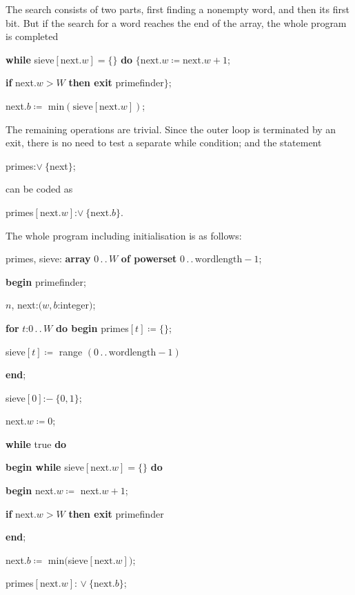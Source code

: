 The search consists of two parts, first finding a nonempty word, and then its first bit. But if the search for a word reaches the end of the array, the whole program is completed

\quad \textbf{while} sieve$[\text{next}.w] = \{\}$ \textbf{do} $\{\text{next}.w \coloneq \text{next}.w +1$;

\quad \quad \textbf{if} next.$w > W$ \textbf{then exit} primefinder$\}$;

\quad \quad next.$b\coloneq$ min$(\text{sieve}[\text{next}.w])$;

The remaining operations are trivial. Since the outer loop is terminated by an exit, there is no need to test a separate while condition; and the statement

\quad primes:$\vee\ \{$next$\}$;

\noindent
can be coded as

\quad primes$[\text{next}.w]$:$\vee\ \{\text{next}.b\}$.

The whole program including initialisation is as follows:

\quad primes, sieve: \textbf{array} $0\,.\,.\,W$ \textbf{of powerset} $0\,.\,.\,\text{wordlength} - 1$;

\quad \textbf{begin} primefinder;

\quad \quad $n$, next:$(w, b$:integer$)$;

\quad \quad \textbf{for} $t$:$0\,.\,.\,W$ \textbf{do begin} primes$[t] \coloneq \{\}$;

\quad \quad \quad sieve$[t] \coloneq$ range $(0\,.\,.\, \text{wordlength} - 1)$

\quad \quad \textbf{end};

\quad \quad sieve$[0]$:$-\ \{0, 1\}$;

\quad \quad next.$w\coloneq 0$;

\quad \quad \textbf{while} true \textbf{do}

\quad \quad \quad \textbf{begin while} sieve$[\text{next}.w] = \{\}$ \textbf{do}

\quad \quad \quad \quad \textbf{begin} next.$w\coloneq$ next.$w + 1$;

\quad \quad \quad \quad \quad \textbf{if} next.$w > W$ \textbf{then exit} primefinder

\quad \quad \quad \quad \textbf{end};

\quad \quad \quad \quad next.$b\coloneq$ min$($sieve$[\text{next}.w])$;

\quad \quad \quad \quad primes$[\text{next}.w]$: $\vee\ \{\text{next}.b\}$;


